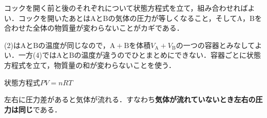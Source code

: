 \begin{sisinE}
コックを開く前と後のそれぞれについて状態方程式を立て，組み合わせればよい．コックを開いたあとは$\mathrm{A}$と$\mathrm{B}$の気体の圧力が等しくなること，そして$\mathrm{A}$，$\mathrm{B}$を合わせた全体の物質量が変わらないことがカギである．

(2)は$\mathrm{A}$と$\mathrm{B}$の温度が同じなので，$\mathrm{A}+\mathrm{B}$を体積$V_{\mathrm{A}}+V_{\mathrm{B}}$の一つの容器とみなしてよい．一方(4)では$\mathrm{A}$と$\mathrm{B}$の温度が違うのでひとまとめにできない．容器ごとに状態方程式を立て，物質量の和が変わらないことを使う．
\end{sisinE}

\begin{key}
\hspace{3mm} 状態方程式\hspace{8mm}$PV=nRT$
\end{key}

\hspace{1zw}左右に圧力差があると気体が流れる．すなわち{\bf 気体が流れていないとき左右の圧力は同じ}である．

